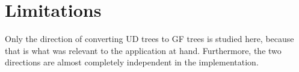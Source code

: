



\section{Limitations}

Only the direction of converting UD trees to GF trees is studied here, because that is what was relevant to the application at hand. Furthermore, the two directions are almost completely independent in the implementation.



%


